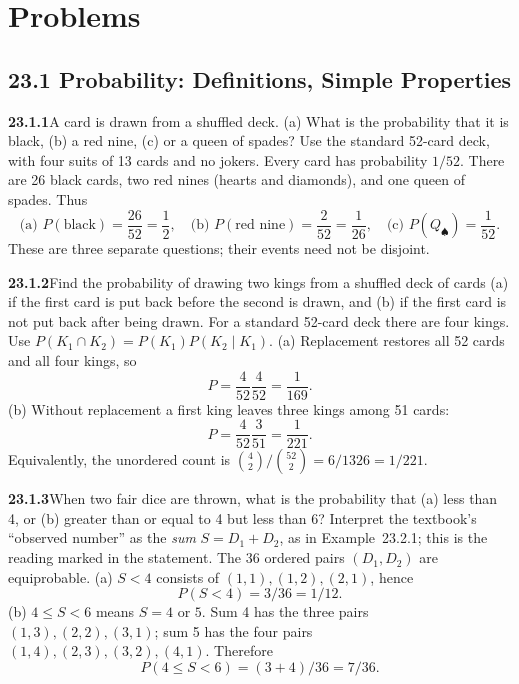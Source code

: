 
\section*{Problems}


\subsection*{23.1 Probability: Definitions, Simple Properties}

\par\bigskip
\noindent\textbf{23.1.1}\quad A card is drawn from a shuffled
deck. (a) What is the probability that it is black, (b) a red
nine, (c) or a queen of spades?
\solution
Use the standard 52-card deck, with four suits of 13 cards and no jokers.
Every card has probability $1/52$. There are 26 black cards, two red
nines (hearts and diamonds), and one queen of spades. Thus
\[
\boxed{\text{(a) }P(\text{black})=\frac{26}{52}=\frac12,\quad
\text{(b) }P(\text{red nine})=\frac2{52}=\frac1{26},\quad
\text{(c) }P(Q_{\spadesuit})=\frac1{52}}.
\]
These are three separate questions; their events need not be disjoint.


\par\bigskip
\noindent\textbf{23.1.2}\quad Find the probability of drawing two
kings from a shuffled deck of cards (a) if the first card is put
back before the second is drawn, and (b) if the first card is not
put back after being drawn.
\solution
For a standard 52-card deck there are four kings. Use
$P(K_1\cap K_2)=P(K_1)P(K_2\mid K_1)$.
(a) Replacement restores all 52 cards and all four kings, so
\[
\boxed{P=\frac4{52}\frac4{52}=\frac1{169}}.
\]
(b) Without replacement a first king leaves three kings among 51 cards:
\[
\boxed{P=\frac4{52}\frac3{51}=\frac1{221}}.
\]
Equivalently, the unordered count is $\binom42/\binom{52}2=6/1326=1/221$.


\par\bigskip
\noindent\textbf{23.1.3}\quad When two fair dice are thrown, what
is the probability that  (a) less than 4,
or (b) greater than or equal to 4 but less than 6?
\solution
Interpret the textbook's ``observed number'' as the \emph{sum}
$S=D_1+D_2$, as in Example~23.2.1; this is the reading marked in the
statement. The 36 ordered pairs $(D_1,D_2)$ are equiprobable.
(a) $S<4$ consists of $(1,1),(1,2),(2,1)$, hence
\[
\boxed{P(S<4)=3/36=1/12}.
\]
(b) $4\le S<6$ means $S=4$ or $5$. Sum 4 has the three pairs
$(1,3),(2,2),(3,1)$; sum 5 has the four pairs
$(1,4),(2,3),(3,2),(4,1)$. Therefore
\[
\boxed{P(4\le S<6)=(3+4)/36=7/36}.
\]


